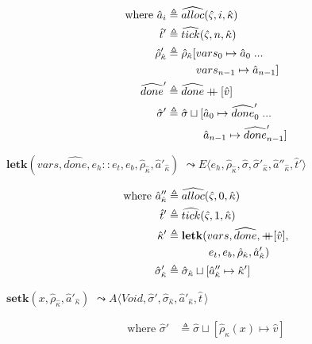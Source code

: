 \documentclass[12pt,draft]{article}
\newcommand\mdoubleplus{\ensuremath{\mathbin{+\mkern-9mu+}}}
\begin{document}
\begin{multicols*}{2}
\begin{align*}
  \text{where } \hat{a}_i &\triangleq \widehat{alloc}(\hat{\varsigma}, i, \hat{\kappa}) \\
  \hat{t}' &\triangleq \widehat{tick}(\hat{\varsigma}, n, \hat{\kappa}) \\
  \hat{\rho}'_{\hat{\kappa}} &\triangleq \hat{\rho}_{\hat{\kappa}}[vars_0 \mapsto \hat{a}_0\;...\\
  &\;\;\;\;\;\;\;\;\;\,  vars_{n-1} \mapsto \hat{a}_{n-1}] \\
  \widehat{done}' &\triangleq \widehat{done} \mdoubleplus [\hat{v}] \\
  \hat{\sigma}' &\triangleq \hat{\sigma} \sqcup [\hat{a}_0 \mapsto \widehat{done}'_0\;...\\
  &\;\;\;\;\;\;\;\;\;\;\;\; \hat{a}_{n-1} \mapsto \widehat{done}'_{n-1}]
\end{align*}
\begin{center}
  $\textbf{letk}(vars, \widehat{done}, e_h::e_t , e_b , \hat{\rho}_{\hat{\kappa}}, \hat{a}'_{\hat{\kappa}})$
  $\leadsto E\langle e_h , \hat{\rho}_{\hat{\kappa}} , \hat{\sigma} , \hat{\sigma}'_{\hat{\kappa}} , \hat{a}''_{\hat{\kappa}} , \hat{t}'\rangle$
\end{center}
\vspace{-7mm}
\begin{align*}
  \text{where } \hat{a}''_{\hat{\kappa}} &\triangleq \widehat{alloc}(\hat{\varsigma}, 0, \hat{\kappa}) \\
  \hat{t}' &\triangleq \widehat{tick}(\hat{\varsigma}, 1, \hat{\kappa}) \\
  \hat{\kappa}' &\triangleq \textbf{letk}(vars, \widehat{done}, \mdoubleplus [\hat{v}],\\
  &\;\;\;\;\;\;\;\;\;\;\;\;\;\, e_t , e_b , \hat{\rho}_{\hat{\kappa}} , \hat{a}'_{\hat{\kappa}}) \\
  \hat{\sigma}'_{\hat{\kappa}} &\triangleq \hat{\sigma}_{\hat{\kappa}} \sqcup [\hat{a}''_{\hat{\kappa}} \mapsto \hat{\kappa}']
\end{align*}
\begin{center}
  $\textbf{setk}(x, \hat{\rho}_{\hat{\kappa}}, \hat{a}'_{\hat{\kappa}})$
  $\leadsto A\langle \textit{Void} , \hat{\sigma}' , \hat{\sigma}_{\hat{\kappa}} , \hat{a}'_{\hat{\kappa}} , \hat{t}\,\rangle$
\end{center}
\vspace{-7mm}
\begin{align*}
  \text{where } \hat{\sigma}' &\triangleq \hat{\sigma} \sqcup [\hat{\rho}_{\hat{\kappa}}(x) \mapsto \hat{v}]
\end{align*}


\end{multicols*}
\end{document}
